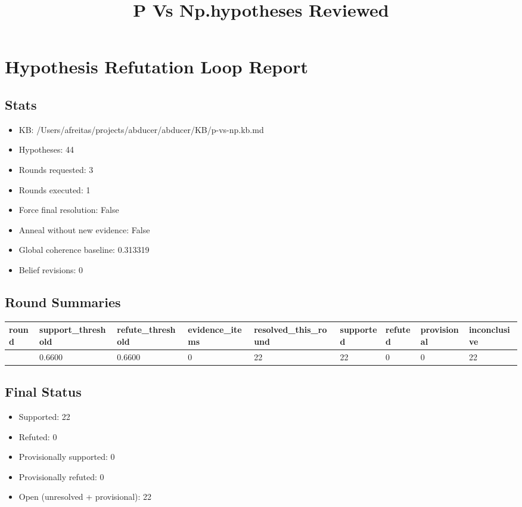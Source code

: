 \documentclass[
]{article}
\title{P Vs Np.hypotheses Reviewed}
\author{}
\date{}
\newcounter{none} %
\providecommand{\tightlist}{%
  \setlength{\itemsep}{0pt}\setlength{\parskip}{0pt}}
\begin{document}
\maketitle

\section{Hypothesis Refutation Loop
Report}\label{hypothesis-refutation-loop-report}

\subsection{Stats}\label{stats}

\begin{itemize}
\tightlist
\item
  KB: /Users/afreitas/projects/abducer/abducer/KB/p-vs-np.kb.md
\item
  Hypotheses: 44
\item
  Rounds requested: 3
\item
  Rounds executed: 1
\item
  Force final resolution: False
\item
  Anneal without new evidence: False
\item
  Global coherence baseline: 0.313319
\item
  Belief revisions: 0
\end{itemize}

\subsection{Round Summaries}\label{round-summaries}

{\def\LTcaptype{none} %
\begin{longtable}[]{@{}lllllllll@{}}
\toprule\noalign{}
round & support\_threshold & refute\_threshold & evidence\_items &
resolved\_this\_round & supported & refuted & provisional &
inconclusive \\
\midrule\noalign{}
\endhead
\bottomrule\noalign{}
\endlastfoot
1 & 0.6600 & 0.6600 & 0 & 22 & 22 & 0 & 0 & 22 \\
\end{longtable}
}

\subsection{Final Status}\label{final-status}

\begin{itemize}
\tightlist
\item
  Supported: 22
\item
  Refuted: 0
\item
  Provisionally supported: 0
\item
  Provisionally refuted: 0
\item
  Open (unresolved + provisional): 22
\end{itemize}
\end{document}
